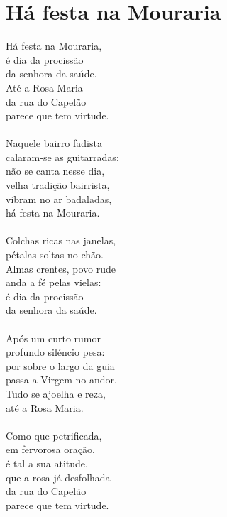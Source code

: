 \documentclass{article}
\begin{document}
\section{ Há festa na Mouraria}
Há festa na Mouraria,\\
é dia da procissão\\
da senhora da saúde.\\
Até a Rosa Maria\\
da rua do Capelão\\
parece que tem virtude.\\
\\
Naquele bairro fadista\\
calaram-se as guitarradas:\\
não se canta nesse dia,\\
velha tradição bairrista,\\
vibram no ar badaladas,\\
há festa na Mouraria.\\
\\
Colchas ricas nas janelas,\\
pétalas soltas no chão.\\
Almas crentes, povo rude\\
anda a fé pelas vielas:\\
é dia da procissão\\
da senhora da saúde.\\
\\
Após um curto rumor\\
profundo siléncio pesa:\\
por sobre o largo da guia\\
passa a Virgem no andor.\\
Tudo se ajoelha e reza,\\
até a Rosa Maria.\\
\\
Como que petrificada,\\
em fervorosa oração,\\
é tal a sua atitude,\\
que a rosa já desfolhada\\
da rua do Capelão\\
parece que tem virtude.\\
\\
\\
\end{document}

